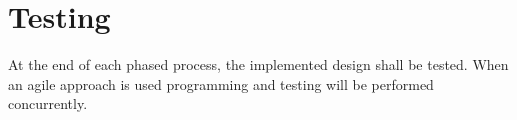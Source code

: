 \documentclass[]{IEEEtran}
\begin{document}
	
\mbox{} \\
\\\\\\\\\\\\\\\\\\\\\\\\\\\\\\\\\\\\\\\\\\\\\\\\\\\\\\\\\\
\\\\\\\\\\\\\\\\\\\\\\\\\\\\\\\\\\ \\\\\\\\\\
	
	\section{Testing}
	
	At the end of each phased process, the implemented design shall be tested. When an agile approach is used programming and testing will be performed concurrently.
	
\end{document}
